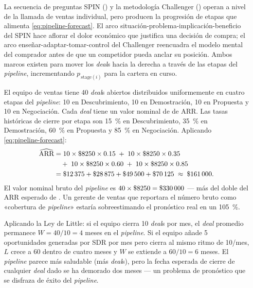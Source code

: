 La secuencia de preguntas SPIN (\textcite{rackham1988spin}) y la metodología Challenger
(\textcite{dixon2011challenger}) operan a nivel de la llamada de ventas individual, pero producen
la progresión de etapas que alimenta \cref{eq:pipeline-forecast}. El arco situación-problema-implicación-beneficio
del SPIN hace aflorar el dolor económico que justifica una decisión de compra; el arco
enseñar-adaptar-tomar-control del Challenger reencuadra el modelo mental del comprador antes de
que un competidor pueda anclar su posición. Ambos marcos existen para mover los \emph{deal}s hacia
la derecha a través de las etapas del \emph{pipeline}, incrementando \(p_{\,\text{stage}(i)}\)
para la cartera en curso.

\begin{example}
El equipo de ventas tiene \num{40} \emph{deal}s abiertos distribuidos uniformemente en cuatro
etapas del \emph{pipeline}: \num{10} en Descubrimiento, \num{10} en Demostración, \num{10} en
Propuesta y \num{10} en Negociación. Cada \emph{deal} tiene un valor nominal de  de
ARR. Las tasas históricas de cierre por etapa son \qty{15}{\percent} en Descubrimiento,
\qty{35}{\percent} en Demostración, \qty{60}{\percent} en Propuesta y \qty{85}{\percent} en
Negociación. Aplicando \cref{eq:pipeline-forecast}:
\begin{align*}
  \widehat{\text{ARR}}
    &= 10\times\$\num{8250}\times0.15
    \;+\; 10\times\$\num{8250}\times0.35 \\
    &\quad +\; 10\times\$\num{8250}\times0.60
    \;+\; 10\times\$\num{8250}\times0.85 \\
    &= \$\num{12375} + \$\num{28875} + \$\num{49500} + \$\num{70125}
     \;\approx\; \$\num{161000}.
\end{align*}
El valor nominal bruto del \emph{pipeline} es \(40\times\$\num{8250}=\$\num{330000}\) --- más del
doble del ARR esperado de . Un gerente de ventas que reportara el número bruto como
«cobertura de \emph{pipeline}» estaría sobreestimando el pronóstico real en un \qty{105}{\percent}.

Aplicando la Ley de Little: si el equipo cierra \num{10} \emph{deal}s por mes, el \emph{deal}
promedio permanece \(W = 40/10 = 4\) meses en el \emph{pipeline}. Si el equipo añade \num{5}
oportunidades generadas por SDR por mes pero cierra al mismo ritmo de \num{10}/mes, \(L\) crece a
\num{60} dentro de cuatro meses y \(W\) se extiende a \(60/10 = 6\) meses. El \emph{pipeline}
parece más saludable (más \emph{deal}s), pero la fecha esperada de cierre de cualquier
\emph{deal} dado se ha demorado dos meses --- un problema de pronóstico que se disfraza de éxito
del \emph{pipeline}.
\end{example}

